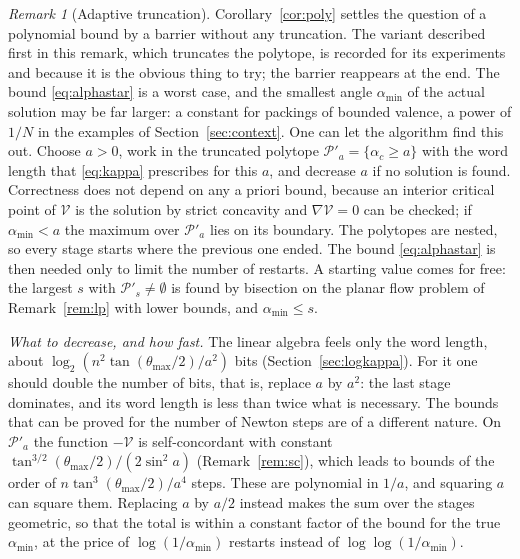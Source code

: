 \documentclass[11pt]{amsart}
\theoremstyle{definition}
\theoremstyle{remark}
\newtheorem{remark}[theorem]{Remark}
\begin{document}
\begin{remark}[Adaptive truncation]\label{rem:adaptive}
Corollary~\ref{cor:poly} settles the question of a polynomial bound by a barrier without any truncation. The variant described first in this remark, which truncates the polytope, is recorded for its experiments and because it is the obvious thing to try; the barrier reappears at the end.
The bound \eqref{eq:alphastar} is a worst case, and the smallest angle $\alpha_{\min}$ of the actual solution may be far larger: a constant for packings of bounded valence, a power of $1/N$ in the examples of Section~\ref{sec:context}. One can let the algorithm find this out. Choose $a>0$, work in the truncated polytope
$\mathcal P'_a=\{\alpha_c\ge a\}$ with the word length that \eqref{eq:kappa} prescribes for this $a$, and decrease $a$ if no solution is found. Correctness does not depend on any a priori bound, because an interior critical point of $\mathcal V$ is the solution by strict concavity and $\nabla\mathcal V=0$ can be checked;
if $\alpha_{\min}<a$ the maximum over $\mathcal P'_a$ lies on its boundary. The polytopes are nested, so every stage starts where the previous one ended. The bound \eqref{eq:alphastar} is then needed only to limit the number of restarts.
A starting value comes for free: the largest $s$ with $\mathcal P'_s\ne\emptyset$ is found by bisection on the planar flow problem of Remark~\ref{rem:lp} with lower bounds, and $\alpha_{\min}\le s$.

\emph{What to decrease, and how fast.} The linear algebra feels only the word length, about $\log_2(n^2\tan(\theta_{\max}/2)/a^2)$ bits (Section~\ref{sec:logkappa}). For it one should double the number of bits, that is, replace $a$ by $a^2$: the last stage dominates, and its word length is less than twice what is necessary.
The bounds that can be proved for the number of Newton steps are of a different nature. On $\mathcal P'_a$ the function $-\mathcal V$ is self-concordant with constant $\tan^{3/2}(\theta_{\max}/2)/(2\sin^2a)$ (Remark~\ref{rem:sc}), which leads to bounds of the order of $n\tan^3(\theta_{\max}/2)/a^4$ steps.
These are polynomial in $1/a$, and squaring $a$ can square them. Replacing $a$ by $a/2$ instead makes the sum over the stages geometric, so that the total is within a constant factor of the bound for the true $\alpha_{\min}$, at the price of $\log(1/\alpha_{\min})$ restarts instead of $\log\log(1/\alpha_{\min})$.


\end{remark}
\end{document}
